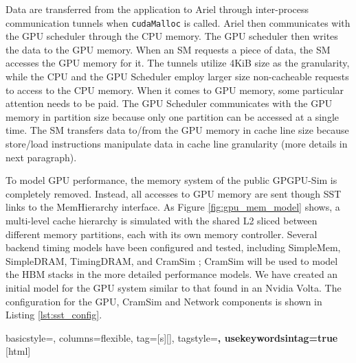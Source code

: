 Data are transferred from the application to Ariel through
inter-process communication tunnels when \texttt{cudaMalloc} is called. 
Ariel then communicates with the GPU scheduler through
the CPU memory. The GPU scheduler then writes the data to the GPU memory. When an SM
requests a piece of data, the SM accesses the GPU memory for it.
The tunnels utilize 4KiB size as the granularity, while the CPU and the GPU Scheduler
employ larger size non-cacheable requests to access to the CPU memory. When it comes to
GPU memory, some particular attention needs to be paid. The GPU Scheduler communicates with 
the GPU memory in partition size because only one partition can be accessed at a single time. 
The SM transfers data to/from the GPU memory in cache line size because store/load 
instructions manipulate data in cache line granularity (more details in next paragraph). 

To model GPU performance, the memory system of the public GPGPU-Sim is
completely removed. Instead, all accesses to GPU memory are sent though SST
links to the MemHierarchy interface. As Figure \ref{fig:gpu_mem_model} shows, a
multi-level cache hierarchy is simulated with the shared L2 sliced between
different memory partitions, each with its own memory controller. Several
backend timing models have been configured and tested, including SimpleMem,
SimpleDRAM, TimingDRAM, and CramSim \cite{healy2017}; CramSim will be used to
model the HBM stacks in the more detailed performance models. We have created an
initial model for the GPU system similar to that found in an Nvidia Volta. The
configuration for the GPU, CramSim and Network components is shown in Listing
\ref{lst:sst_config}.


{
  basicstyle={\small\ttfamily},
  columns=flexible,
  tag=[s]{[]},
  tagstyle=\color{dkgreen}\bfseries,
  usekeywordsintag=true
}[html]




